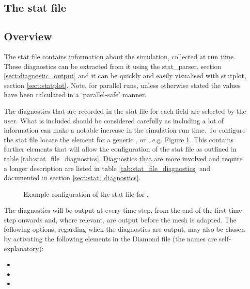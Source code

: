 \subsection{The stat file}
\label{sect:diagnostics_stat_file}

\subsection{Overview}
The stat file contains information about the simulation, collected at run time. These diagnostics can be extracted from it using the stat\_parser, section \ref{sect:diagnostic_output} and it can be quickly and easily visualised with statplot, section \ref{sect:statplot}. Note, for parallel runs, unless otherwise stated the values have been calculated in a `parallel-safe' manner.

The diagnostics that are recorded in the stat file for each field are selected by the user.  What is included should be considered carefully as including a lot of information can make a notable increase in the simulation run time. To configure the stat file locate the  element for a generic ,  or , e.g. Figure \ref{fig:diamond_enable_stat}. This contains further elements that will allow the configuration of the stat file as outlined in table \ref{tab:stat_file_diagnostics}. Diagnostics that are more involved and require a longer description are listed in table \ref{tab:stat_file_diagnostics} and documented in section \ref{sect:stat_diagnostics}.

\begin{figure}[ht]
  \centering
  \caption{Example configuration of the stat file for .}
  \label{fig:diamond_enable_stat}
\end{figure}

The diagnostics will be output at every time step, from the end of the first time step onwards and, where relevant, are output before the mesh is adapted. The following options, regarding when the diagnostics are output, may also be chosen by activating the following elements in the Diamond file (the names are self-explanatory):
\begin{itemize}
\item {}
\item {}
\item {}
\end{itemize}  

